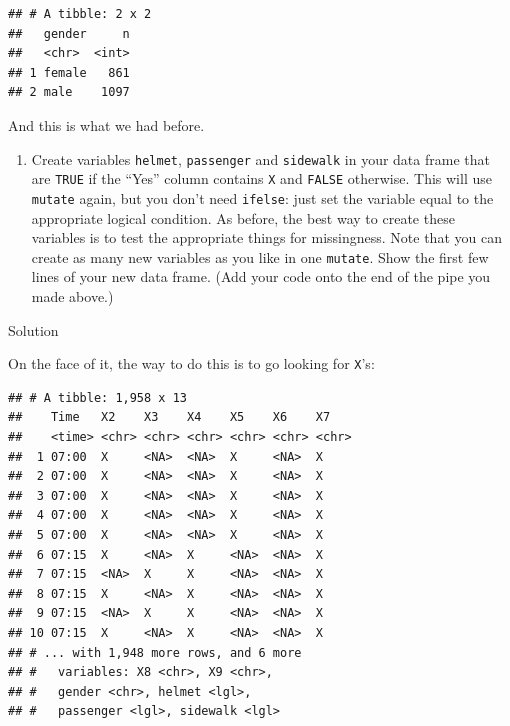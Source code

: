 \documentclass[]{tufte-book}
\newenvironment{Shaded}{}{}
\newcommand{\DataTypeTok}[1]{\textcolor[rgb]{0.56,0.13,0.00}{#1}}
\newcommand{\KeywordTok}[1]{\textcolor[rgb]{0.00,0.44,0.13}{\textbf{#1}}}
\newcommand{\NormalTok}[1]{#1}
\newcommand{\OperatorTok}[1]{\textcolor[rgb]{0.40,0.40,0.40}{#1}}
\newcommand{\StringTok}[1]{\textcolor[rgb]{0.25,0.44,0.63}{#1}}
\providecommand{\tightlist}{%
  \setlength{\itemsep}{0pt}\setlength{\parskip}{0pt}}
\theoremstyle{definition}
\theoremstyle{definition}
\theoremstyle{definition}
\theoremstyle{remark}
\begin{document}
\begin{verbatim}
## # A tibble: 2 x 2
##   gender     n
##   <chr>  <int>
## 1 female   861
## 2 male    1097
\end{verbatim}

And this is what we had before.

\begin{enumerate}
\def\labelenumi{(\alph{enumi})}
\setcounter{enumi}{5}
\tightlist
\item
  Create variables \texttt{helmet}, \texttt{passenger} and
  \texttt{sidewalk} in your data frame that are \texttt{TRUE} if the
  ``Yes'' column contains \texttt{X} and \texttt{FALSE} otherwise. This
  will use \texttt{mutate} again, but you don't need \texttt{ifelse}:
  just set the variable equal to the appropriate logical condition. As
  before, the best way to create these variables is to test the
  appropriate things for missingness. Note that you can create as many
  new variables as you like in one \texttt{mutate}. Show the first few
  lines of your new data frame. (Add your code onto the end of the pipe
  you made above.)
\end{enumerate}

Solution

On the face of it, the way to do this is to go looking for \texttt{X}'s:

\begin{Shaded}
\end{Shaded}

\begin{verbatim}
## # A tibble: 1,958 x 13
##    Time   X2    X3    X4    X5    X6    X7   
##    <time> <chr> <chr> <chr> <chr> <chr> <chr>
##  1 07:00  X     <NA>  <NA>  X     <NA>  X    
##  2 07:00  X     <NA>  <NA>  X     <NA>  X    
##  3 07:00  X     <NA>  <NA>  X     <NA>  X    
##  4 07:00  X     <NA>  <NA>  X     <NA>  X    
##  5 07:00  X     <NA>  <NA>  X     <NA>  X    
##  6 07:15  X     <NA>  X     <NA>  <NA>  X    
##  7 07:15  <NA>  X     X     <NA>  <NA>  X    
##  8 07:15  X     <NA>  X     <NA>  <NA>  X    
##  9 07:15  <NA>  X     X     <NA>  <NA>  X    
## 10 07:15  X     <NA>  X     <NA>  <NA>  X    
## # ... with 1,948 more rows, and 6 more
## #   variables: X8 <chr>, X9 <chr>,
## #   gender <chr>, helmet <lgl>,
## #   passenger <lgl>, sidewalk <lgl>
\end{verbatim}
\end{document}
